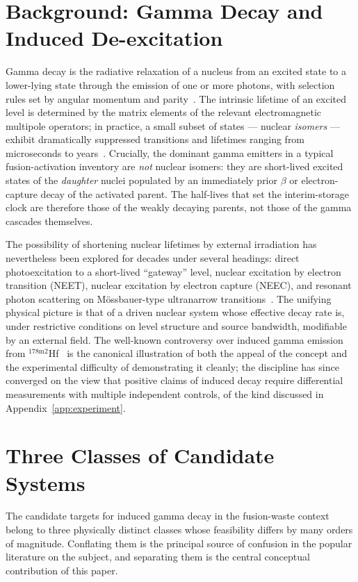 \documentclass[conference]{IEEEtran}
\begin{document}
\section{Background: Gamma Decay and Induced De-excitation}
\label{sec:bg}
Gamma decay is the radiative relaxation of a nucleus from an excited state to a lower-lying state through the emission of one or more photons, with selection rules set by angular momentum and parity~\cite{krane1988}. The intrinsic lifetime of an excited level is determined by the matrix elements of the relevant electromagnetic multipole operators; in practice, a small subset of states --- nuclear \emph{isomers} --- exhibit dramatically suppressed transitions and lifetimes ranging from microseconds to years~\cite{walker1999nature,walker2020isomers}. Crucially, the dominant gamma emitters in a typical fusion-activation inventory are \emph{not} nuclear isomers: they are short-lived excited states of the \emph{daughter} nuclei populated by an immediately prior $\beta$ or electron-capture decay of the activated parent. The half-lives that set the interim-storage clock are therefore those of the weakly decaying parents, not those of the gamma cascades themselves.

The possibility of shortening nuclear lifetimes by external irradiation has nevertheless been explored for decades under several headings: direct photoexcitation to a short-lived ``gateway'' level, nuclear excitation by electron transition (NEET), nuclear excitation by electron capture (NEEC), and resonant photon scattering on M\"ossbauer-type ultranarrow transitions~\cite{karpeshin2006induced,palffy2007neec,chumakov2018narrow}. The unifying physical picture is that of a driven nuclear system whose effective decay rate is, under restrictive conditions on level structure and source bandwidth, modifiable by an external field. The well-known controversy over induced gamma emission from $^{178\mathrm{m}2}$Hf~\cite{collins1999hafnium,ahmad2003hafnium} is the canonical illustration of both the appeal of the concept and the experimental difficulty of demonstrating it cleanly; the discipline has since converged on the view that positive claims of induced decay require differential measurements with multiple independent controls, of the kind discussed in Appendix~\ref{app:experiment}.

\section{Three Classes of Candidate Systems}
\label{sec:cases}
The candidate targets for induced gamma decay in the fusion-waste context belong to three physically distinct classes whose feasibility differs by many orders of magnitude. Conflating them is the principal source of confusion in the popular literature on the subject, and separating them is the central conceptual contribution of this paper.
\end{document}

